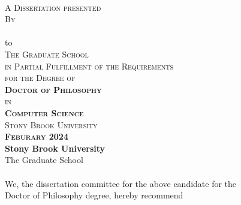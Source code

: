 \begin{center}
    
    \thispagestyle{empty}
    {\large \textsc{\textbf{\ttitle}}}  \\
    \vspace{0.9cm}
    \textsc{A Dissertation presented}  \\
    \vspace{0.45cm}
    \textsc{By}  \\
    \vspace{0.45cm}
    {\large \textsc{\textbf{\authorname}}}  \\
    \vspace{0.9cm}
    to  \\
    \vspace{0.45cm}
    \textsc{The Graduate School}  \\
    \vspace{0.45cm}
    \textsc{in Partial Fulfillment of the Requirements}  \\
    \vspace{0.45cm}
    \textsc{for the Degree of}  \\
    \vspace{0.45cm}
    \textsc{\textbf{Doctor of Philosophy}}  \\
    \vspace{0.45cm}
    \textsc{in}  \\
    \vspace{0.45cm}
    \textsc{\textbf{Computer Science}}  \\
    \vspace{1.2cm}
    \textsc{Stony Brook University}  \\
    \vspace{1.2cm}
    \textsc{\textbf{Feburary 2024}}  \\
    \eject 
    \setcounter{page}{2}
    {\large \textbf{Stony Brook University}}  \\
    \vspace{0.25cm}
    The Graduate School  \\
    \vspace{0.5cm}
    \textbf{\authorname}  \\
    \vspace{0.5cm}
    {We}, the dissertation committee for the above candidate for the  \\
    \vspace{0.25cm}
    Doctor of Philosophy degree, hereby recommend  \\

\end{center}

